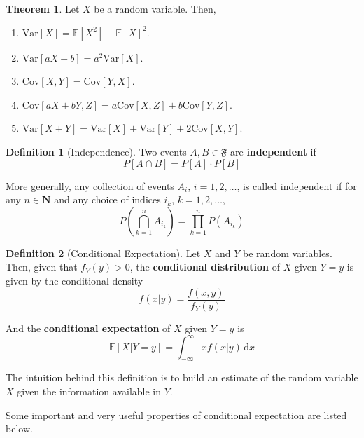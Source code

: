\documentclass[12pt,a4paper]{article}
\theoremstyle{definition}
\newtheorem{theorem}{Theorem}[section]
\newtheorem{definition}{Definition}[section]
\begin{document}
\begin{theorem}
	Let $X$ be a random variable. Then,
	\begin{enumerate}
		\item $\text{Var}[X] = \mathbb{E}[X^2] - \mathbb{E}[X]^2$.
		\item $\text{Var}[aX+b] = a^2 \text{Var}[X]$.
		\item $\text{Cov}[X,Y] = \text{Cov}[Y,X]$.
		\item $\text{Cov}[aX+bY,Z] = a \text{Cov}[X,Z] + b \text{Cov}[Y,Z]$.
		\item $\text{Var}[X+Y] = \text{Var}[X] + \text{Var}[Y] + 2 \text{Cov}[X,Y]$.
	\end{enumerate}		
\end{theorem}

\begin{definition}[Independence]
	Two events $A, B \in \mathfrak{F}$ are \textbf{independent} if
	\[
		P[A \cap B] = P[A]\cdot P[B]
	\]
	
	More generally, any collection of events $A_i$, $i = 1,2,\ldots$, is called independent if for any $n \in \textbf{N}$ and any choice of indices $i_k$, $k = 1, 2, \ldots$, 
	\[
		P \left( \bigcap_{k=1}^n A_{i_k} \right) = \prod_{k=1}^n P\left( A_{i_k} \right)
	\]
\end{definition}

\begin{definition}[Conditional Expectation]
	Let $X$ and $Y$ be random variables. Then, given that $f_Y(y) > 0$, the \textbf{conditional distribution} of $X$ given $Y=y$ is given by the conditional density
	\[
		f(x|y) = \frac{f(x,y)}{f_Y(y)}
	\]
	
	And the \textbf{conditional expectation} of $X$ given $Y=y$ is
	\[
		\mathbb{E} [X| Y = y] = \int_{-\infty}^\infty x f(x|y) \, \mathrm{d}x
	\]
\end{definition}

The intuition behind this definition is to build an estimate of the random variable $X$ given the information available in $Y$.

Some important and very useful properties of conditional expectation are listed below.
\end{document}
